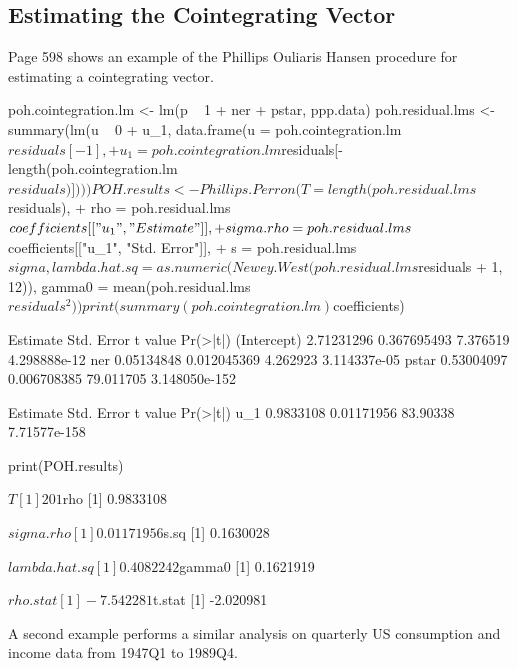 \documentclass[a4paper]{article}
\begin{document}
\subsection{Estimating the Cointegrating Vector}
Page 598 shows an example of the Phillips Ouliaris Hansen procedure for estimating a cointegrating vector.
\begin{Schunk}
\begin{Sinput}
 poh.cointegration.lm <- lm(p ~ 1 + ner + pstar, ppp.data)
 poh.residual.lms <- summary(lm(u ~ 0 + u_1, data.frame(u = poh.cointegration.lm$residuals[-1], 
+     u_1 = poh.cointegration.lm$residuals[-length(poh.cointegration.lm$residuals)])))
 POH.results <- Phillips.Perron(T = length(poh.residual.lms$residuals), 
+     rho = poh.residual.lms$coefficients[["u_1", "Estimate"]], 
+     sigma.rho = poh.residual.lms$coefficients[["u_1", "Std. Error"]], 
+     s = poh.residual.lms$sigma, lambda.hat.sq = as.numeric(Newey.West(poh.residual.lms$residuals %
+         1, 12)), gamma0 = mean(poh.residual.lms$residuals^2))
 print(summary(poh.cointegration.lm)$coefficients)
\end{Sinput}
\begin{Soutput}
              Estimate  Std. Error   t value      Pr(>|t|)
(Intercept) 2.71231296 0.367695493  7.376519  4.298888e-12
ner         0.05134848 0.012045369  4.262923  3.114337e-05
pstar       0.53004097 0.006708385 79.011705 3.148050e-152
\end{Soutput}
\begin{Soutput}
     Estimate Std. Error  t value     Pr(>|t|)
u_1 0.9833108 0.01171956 83.90338 7.71577e-158
\end{Soutput}
\begin{Sinput}
 print(POH.results)
\end{Sinput}
\begin{Soutput}
$T
[1] 201

$rho
[1] 0.9833108

$sigma.rho
[1] 0.01171956

$s.sq
[1] 0.1630028

$lambda.hat.sq
[1] 0.4082242

$gamma0
[1] 0.1621919

$rho.stat
[1] -7.542281

$t.stat
[1] -2.020981
\end{Soutput}
\end{Schunk}
A second example performs a similar analysis on quarterly US consumption and income data from 1947Q1 to 1989Q4.
\end{document}
